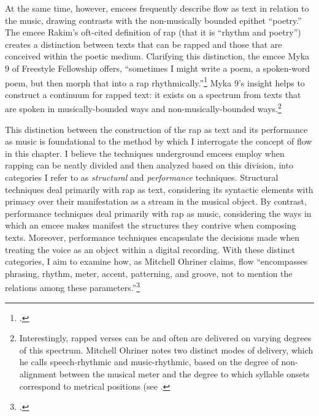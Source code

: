 At the same time, however, emcees frequently describe flow as text in relation to the music, drawing
contrasts with the non-musically bounded epithet ``poetry.'' The emcee Rakim's oft-cited definition
of rap (that it is ``rhythm and poetry'') creates a distinction between texts that can be rapped and
those that are conceived within the poetic medium. Clarifying this distinction, the emcee Myka 9 of
Freestyle Fellowship offers, ``sometimes I might write a poem, a spoken-word poem, but then morph
that into a rap rhythmically.''\footnote{
    \autocite[63]{pauledwardsHowRapArt2009}.}
Myka 9's insight helps to construct a continuum for rapped text: it exists on a spectrum from
texts that are spoken in musically-bounded ways and non-musically-bounded ways.\footnote{
    Interestingly, rapped verses can be and often are delivered on varying degrees of this
    spectrum. Mitchell Ohriner notes two distinct modes of delivery, which he calls speech-rhythmic
    and music-rhythmic, based on the degree of non-alignment between the musical meter and the 
    degree to which syllable onsets correspond to metrical positions (see 
    \cite{mitchellohrinerLyricRhythmNonalignment2019}.}

This distinction between the construction of the rap as text and its performance as music is
foundational to the method by which I interrogate the concept of flow in this chapter. I believe
the techniques underground emcees employ when rapping can be neatly divided and then analyzed based
on this division, into categories I refer to as \emph{structural} and \emph{performance} techniques.
Structural techniques deal primarily with rap as text, considering its syntactic elements with primacy
over their manifestation as a stream in the musical object. By contrast, performance techniques deal
primarily with rap as music, considering the ways in which an emcee makes manifest the structures
they contrive when composing texts. Moreover, performance techniques encapsulate the decisions made
when treating the voice as an object within a digital recording. With these distinct categories,
I aim to examine how, as Mitchell Ohriner claims, flow ``encompasses phrasing, rhythm, meter, accent,
patterning, and groove, not to mention the relations among these parameters.''\footnote{
    \autocite[28]{mitchellohrinerFlowRhythmicVoice2019}.}

